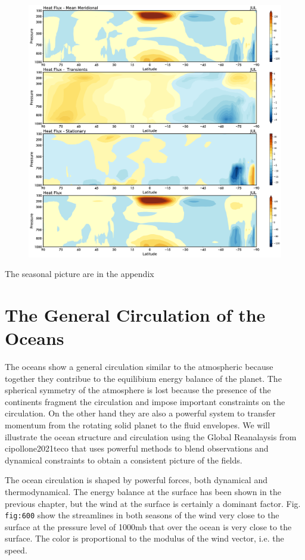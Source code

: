 \begin{figure}
	\centering
	\includegraphics[width = .7 \textwidth]{figs/GD/JULTVFlux.png}
	\caption{}\label{}
\end{figure}

The seasonal picture are in the appendix

\section{The General Circulation of the
  Oceans}\label{the-general-circulation-of-the-oceans}

The oceans show a general circulation similar to the atmospheric because
together they contribue to the equilibium energy balance of the planet.
The spherical symmetry of the atmosphere is lost because the presence of
the continents fragment the circulation and impose important constraints
on the circulation. On the other hand they are also a powerful system to
transfer momentum from the rotating solid planet to the fluid envelopes.
We will illustrate the ocean structure and circulation using the Global
Reanalaysis from cipollone2021teco that uses powerful methods to blend
observations and dynamical constraints to obtain a consistent picture of
the fields.

The ocean circulation is shaped by powerful forces, both dynamical and
thermodynamical. The energy balance at the surface has been shown in the
previous chapter, but the wind at the surface is certainly a dominant
factor. Fig. \texttt{fig:600} show the streamlines in both seasons of
the wind very close to the surface at the pressure level of 1000mb that
over the ocean is very close to the surface. The color is proportional
to the modulus of the wind vector, i.e. the speed.

